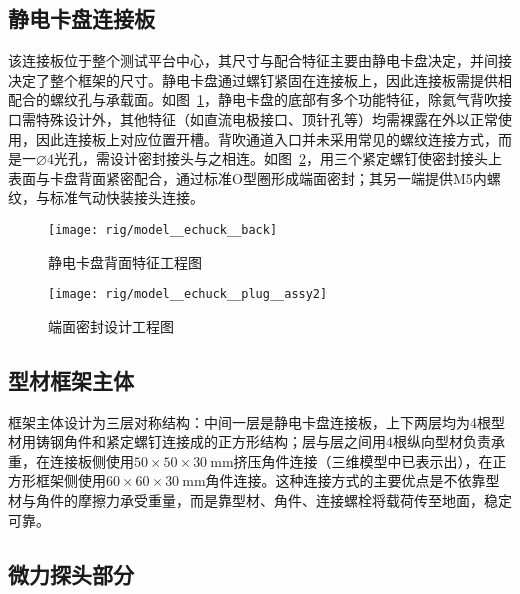 \subsection{静电卡盘连接板}\label{sec:rig-model-base}

该连接板位于整个测试平台中心，其尺寸与配合特征主要由静电卡盘决定，并间接决定了整个框架的尺寸。静电卡盘通过螺钉紧固在连接板上，因此连接板需提供相配合的螺纹孔与承载面。如图~\ref{fig:rig-model-echuck-back}\footnotemark{}，静电卡盘的底部有多个功能特征，除氦气背吹接口需特殊设计外，其他特征（如直流电极接口、顶针孔等）均需裸露在外以正常使用，因此连接板上对应位置开槽。背吹通道入口并未采用常见的螺纹连接方式，而是一$\diameter{}4$光孔，需设计密封接头与之相连。如图~\ref{fig:rig-model-echuck-plug-assy}，用三个紧定螺钉使密封接头上表面与卡盘背面紧密配合，通过标准O型圈形成端面密封；其另一端提供M5内螺纹，与标准气动快装接头连接。


\begin{figure}[tbhp]
\centering
\texttt{[image: rig/model\_\_echuck\_\_back]}
\caption{静电卡盘背面特征工程图}
\label{fig:rig-model-echuck-back}
\end{figure}

\begin{figure}[tbhp]
\centering
\texttt{[image: rig/model\_\_echuck\_\_plug\_\_assy2]}
\caption{端面密封设计工程图}
\label{fig:rig-model-echuck-plug-assy}
\end{figure}


\subsection{型材框架主体}\label{sec:rig-model-frame}

框架主体设计为三层对称结构：中间一层是静电卡盘连接板，上下两层均为4根型材用铸钢角件和紧定螺钉连接成的正方形结构；层与层之间用4根纵向型材负责承重，在连接板侧使用$\num{50}\times\num{50}\times\SI{30}{\milli\meter}$挤压角件连接（三维模型中已表示出），在正方形框架侧使用$\num{60}\times\num{60}\times\SI{30}{\milli\meter}$角件连接。这种连接方式的主要优点是不依靠型材与角件的摩擦力承受重量，而是靠型材、角件、连接螺栓将载荷传至地面，稳定可靠。


\subsection{微力探头部分}\label{sec:rig-model-probe}

